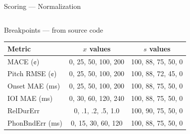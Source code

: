 \documentclass[aspectratio=169,9pt]{beamer}
\begin{document}
\begin{frame}{Scoring --- Normalization}
\begin{columns}[T]
      \begin{exampleblock}{Breakpoints — from source code}
        \footnotesize
        \renewcommand{\arraystretch}{1.2}
        \begin{tabular}{@{}lcc@{}}
          \toprule
          Metric & $x$ values & $s$ values \\
          \midrule
          MACE (¢)         & 0, 25, 50, 100, 200   & 100, 88, 75, 50, 0 \\
          Pitch RMSE (¢)   & 0, 25, 50, 100, 200   & 100, 88, 72, 45, 0 \\
          Onset MAE (ms)   & 0, 25, 50, 100, 200   & 100, 88, 75, 50, 0 \\
          IOI MAE (ms)     & 0, 30, 60, 120, 240   & 100, 88, 75, 50, 0 \\
          RelDurErr        & 0, .1, .2, .5, 1.0    & 100, 90, 75, 50, 0 \\
          PhonBndErr (ms)  & 0, 15, 30, 60, 120    & 100, 88, 75, 50, 0 \\
          \bottomrule
        \end{tabular}
      \end{exampleblock}
    \end{columns}
\end{frame}
\end{document}

